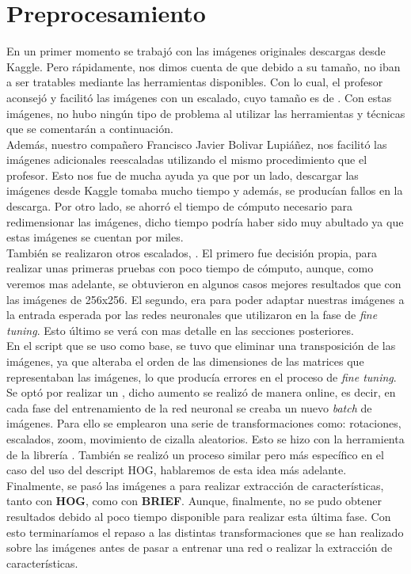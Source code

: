 \section{Preprocesamiento}

En un primer momento se trabajó con las imágenes originales descargas desde Kaggle. Pero rápidamente, nos dimos cuenta de que debido a su tamaño, no iban a ser tratables mediante las herramientas disponibles. Con lo cual, el profesor aconsejó y facilitó las imágenes con un escalado, cuyo tamaño es de . Con estas imágenes, no hubo ningún tipo de problema al utilizar las herramientas y técnicas que se comentarán a continuación.\\

Además, nuestro compañero Francisco Javier Bolivar Lupiáñez, nos facilitó las imágenes adicionales reescaladas utilizando el mismo procedimiento que el profesor. Esto nos fue de mucha ayuda ya que por un lado, descargar las imágenes desde Kaggle tomaba mucho tiempo y además, se producían fallos en la descarga. Por otro lado, se ahorró el tiempo de cómputo necesario para redimensionar las imágenes, dicho tiempo podría haber sido muy abultado ya que estas imágenes se cuentan por miles.\\

También se realizaron otros escalados, . El primero fue decisión propia, para realizar unas primeras pruebas con poco tiempo de cómputo, aunque, como veremos mas adelante, se obtuvieron en algunos casos mejores resultados que con las imágenes de 256x256. El segundo, era para poder adaptar nuestras imágenes a la entrada esperada por las redes neuronales que utilizaron en la fase de \textit{fine tuning}. Esto último se verá con mas detalle en las secciones posteriores.\\

En el script que se uso como base, se tuvo que eliminar una transposición de las imágenes, ya que alteraba el orden de las dimensiones de las matrices que representaban las imágenes, lo que producía errores en el proceso de \textit{fine tuning}.\\

Se optó por realizar un , dicho aumento se realizó de manera online, es decir, en cada fase del entrenamiento de la red neuronal se creaba un nuevo \textit{batch} de imágenes. Para ello se emplearon una serie de transformaciones como: rotaciones, escalados, zoom, movimiento de cizalla aleatorios. Esto se hizo con la herramienta  de la librería . También se realizó un proceso similar pero más específico en el caso del uso del descript HOG, hablaremos de esta idea más adelante.\\

Finalmente, se pasó las imágenes a  para realizar extracción de características, tanto con \textbf{HOG}, como con \textbf{BRIEF}. Aunque, finalmente, no se pudo obtener resultados debido al poco tiempo disponible para realizar esta última fase. Con esto terminaríamos el repaso a las distintas transformaciones que se han realizado sobre las imágenes antes de pasar a entrenar una red o realizar la extracción de características.
